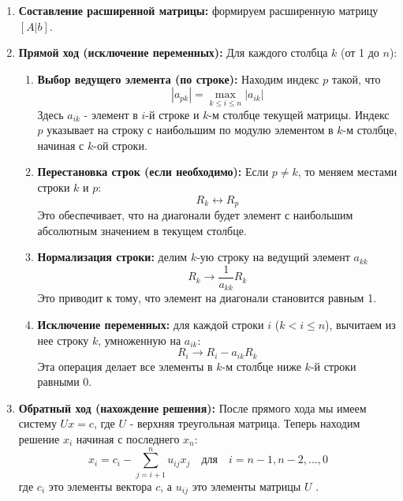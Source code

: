 \begin{enumerate}
    \item \textbf{Составление расширенной матрицы:} формируем расширенную матрицу $[A|b]$.

    \item \textbf{Прямой ход (исключение переменных):}
        Для каждого столбца $k$ (от 1 до $n$):
        \begin{enumerate}
            \item \textbf{Выбор ведущего элемента (по строке):}
               Находим индекс $p$ такой, что
               \begin{equation}
                  |a_{pk}| = \max_{k \leq i \leq n} |a_{ik}|
                   \label{eq:leading_elem}
               \end{equation}
               Здесь $a_{ik}$ - элемент в $i$-й строке и $k$-м столбце текущей матрицы. Индекс $p$ указывает на строку с наибольшим по модулю элементом в $k$-м столбце, начиная с $k$-ой строки.

           \item \textbf{Перестановка строк (если необходимо):}
                Если $p \neq k$, то меняем местами строки $k$ и $p$:
                \[
                   R_k \leftrightarrow R_p
                \]
            Это обеспечивает, что на диагонали будет элемент с наибольшим абсолютным значением в текущем столбце.

            \item \textbf{Нормализация строки:} делим $k$-ую строку на ведущий элемент $a_{kk}$
                \[
                    R_k \rightarrow \frac{1}{a_{kk}} R_k
                \]
               Это приводит к тому, что элемент на диагонали становится равным 1.

            \item \textbf{Исключение переменных:} для каждой строки $i$ ($k<i \leq n$), вычитаем из нее строку $k$, умноженную на $a_{ik}$:
                \[
                   R_i \rightarrow R_i - a_{ik} R_k
                \]
                Эта операция делает все элементы в $k$-м столбце ниже $k$-й строки равными 0.
        \end{enumerate}

    \item \textbf{Обратный ход (нахождение решения):}
        После прямого хода мы имеем систему $Ux = c$, где $U$ - верхняя треугольная матрица. Теперь находим решение $x_i$ начиная с последнего $x_n$:
           \begin{equation}
               x_i = c_i - \sum_{j=i+1}^n u_{ij} x_j \quad \text{для} \quad i = n-1, n-2, ..., 0
                \label{eq:back_substitution}
            \end{equation}
         где $c_i$ это элементы вектора $c$, а $u_{ij}$ это элементы матрицы $U$ \cite{isaev2011methods}.
\end{enumerate}

